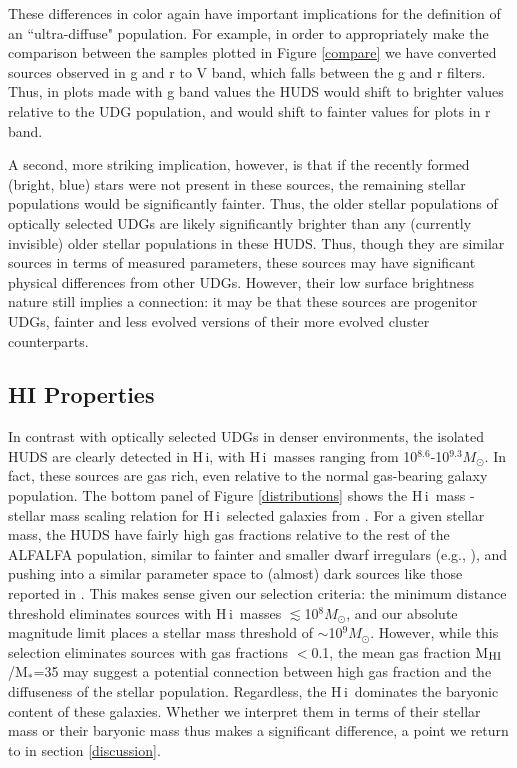 \documentclass[twocolumn]{aastex6}
\newcommand{\msun}{M_{\odot}}
\def\msun{$M_\odot$}
\newcommand{\hi}{H{\sc\,i}}
\begin{document}
These differences in color again have important implications for the definition of an ``ultra-diffuse" population. For example, in order to appropriately make the comparison between the samples plotted in Figure \ref{compare} we have converted sources observed in g and r to V band, which falls between the g and r filters. Thus, in plots made with g band values the HUDS would shift to brighter values relative to the UDG population, and would shift to fainter values for plots in r band.

A second, more striking implication, however, is that if the recently formed (bright, blue) stars were not present in these sources, the remaining stellar populations would be significantly fainter. Thus, the older stellar populations of optically selected UDGs are likely significantly brighter than any (currently invisible) older stellar populations in these HUDS. Thus, though they are similar sources in terms of measured parameters, these sources may have significant physical differences from other UDGs. However, their low surface brightness nature still implies a connection: it may be that these sources are progenitor UDGs, fainter and less evolved versions of their more evolved cluster counterparts.

\subsection{HI Properties}
\label{results.hi}

In contrast with optically selected UDGs in denser environments, the isolated HUDS are clearly detected in \hi, with \hi\ masses ranging from 10$^{8.6}$-10$^{9.3}$\msun. In fact, these sources are gas rich, even relative to the normal gas-bearing galaxy population. The bottom panel of Figure \ref{distributions} shows the \hi\ mass - stellar mass scaling relation for \hi\ selected galaxies from \cite{huang12b}. For a given stellar mass, the HUDS have fairly high gas fractions relative to the rest of the ALFALFA population, similar to fainter and smaller dwarf irregulars (e.g., \citealp{lee03a}), and pushing into a similar parameter space to (almost) dark sources like those reported in \cite{janowiecki15a}. This makes sense given our selection criteria: the minimum distance threshold eliminates sources with \hi\ masses $\lesssim$10$^8$\msun, and our absolute magnitude limit places a stellar mass threshold of $\sim$10$^9$\msun. However, while this selection eliminates sources with gas fractions $<$0.1, the mean gas fraction M$_{\rm HI}$/M$_*$=35 may suggest a potential connection between high gas fraction and the diffuseness of the stellar population. Regardless, the \hi\ dominates the baryonic content of these galaxies. Whether we interpret them in terms of their stellar mass or their baryonic mass thus makes a significant difference, a point we return to in section \ref{discussion}.
\end{document}
